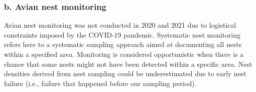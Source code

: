 \documentclass[a4paper,twoside,12pt]{article}
\begin{document}
		\subsubsection*{b. Avian nest monitoring}
Avian nest monitoring was not conducted in 2020 and 2021 due to logistical constraints imposed by the COVID-19 pandemic. Systematic nest monitoring refers here to a systematic sampling approach aimed at documenting all nests within a specified area. Monitoring is considered opportunistic when there is a chance that some nests might not have been detected within a specific area. Nest densities derived from nest sampling could be underestimated due to early nest failure (i.e., failure that happened before our sampling period).


\end{document}
